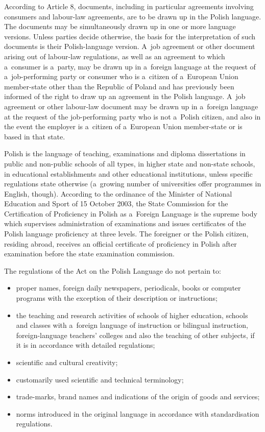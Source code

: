 \begin{multicols}{2}
According to Article 8, documents, including in particular agreements
involving consumers and labour-law agreements, are to be drawn up in
the Polish language. The documents may be simultaneously drawn up in
one or more language versions. Unless parties decide otherwise, the
basis for the interpretation of such documents is their
Polish-language version. A~job agreement or other document arising out
of labour-law regulations, as well as an agreement to which a~consumer
is a~party, may be drawn up in a~foreign language at the request of
a~job-performing party or consumer who is a~citizen of a~European
Union member-state other than the Republic of Poland and has
previously been informed of the right to draw up an agreement in the
Polish language. A~job agreement or other labour-law document may be
drawn up in a~foreign language at the request of the job-performing
party who is not a~Polish citizen, and also in the event the employer
is a~citizen of a~European Union member-state or is based in that
state. 

Polish is the language of teaching, examinations and diploma
dissertations in public and non-public schools of all types, in higher
state and non-state schools, in educational establishments and other
educational institutions, unless specific regulations state otherwise
(a~growing number of universities offer programmes in English,
though). According to the ordinance of the Minister of National
Education and Sport of 15 October 2003, the State Commission for the
Certification of Proficiency in Polish as a~Foreign Language is the
supreme body which supervises administration of examinations and
issues certificates of the Polish language proficiency at three
levels. The foreigner or the Polish citizen, residing abroad, receives
an official certificate of proficiency in Polish after examination
before the state examination commission. 

The regulations of the Act on the Polish Language do not pertain to:
\begin{itemize} \item proper names, foreign daily newspapers,
periodicals, books or computer programs with the exception of their
description or instructions; \item the teaching and research
activities of schools of higher education, schools and classes with
a~foreign language of instruction or bilingual instruction,
foreign-language teachers’ colleges and also the teaching of other
subjects, if it is in accordance with detailed regulations; \item
scientific and cultural creativity; \item customarily used scientific
and technical terminology; \item trade-marks, brand names and
indications of the origin of goods and services; \item norms
introduced in the original language in accordance with standardisation
regulations. \end{itemize} 


\end{multicols}
